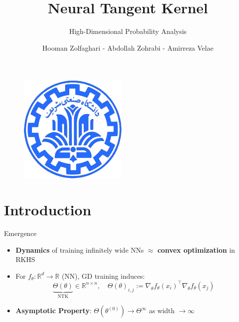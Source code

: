 \documentclass[serif, aspectratio=169]{beamer}
\author{Hooman Zolfaghari - Abdollah Zohrabi - Amirreza Velae}
\title{Neural Tangent Kernel}
\subtitle{High-Dimensional Probability Analysis}
\institute{
    Sharif University of Technology
}
\begin{document}
\begin{frame}
    \titlepage
    \vspace*{-0.6cm}
    \begin{figure}[htpb]
        \begin{center}
            \includegraphics[keepaspectratio, scale=0.25]{pic/sharif-main-logo.png}
        \end{center}
    \end{figure}
\end{frame}

\begin{frame}    
\tableofcontents[sectionstyle=show,
subsectionstyle=show/shaded/hide,
subsubsectionstyle=show/shaded/hide]
\end{frame}

\section{Introduction}

\begin{frame}{Emergence}
	\begin{itemize}
		\item \textbf{Dynamics} of training infinitely wide NNs \(\approx\) \textbf{convex optimization} in RKHS
		
		\vspace{0.5em}
		\item For \(f_\theta: \mathbb{R}^d \to \mathbb{R}\) (NN), GD training induces:
		\[
		\underbrace{\Theta(\theta)}_{\text{NTK}} \in \mathbb{R}^{n\times n}, \quad \Theta(\theta)_{i,j}:= \nabla_\theta f_\theta(x_i)^\top \nabla_\theta f_\theta(x_j) 
		\]
		
		\item \textbf{Asymptotic Property}: \(\Theta(\theta^{(0)}) \to \Theta^{\infty}\) as width \(\to \infty\)
		
	\end{itemize}
	
	
\end{frame}
\end{document}
